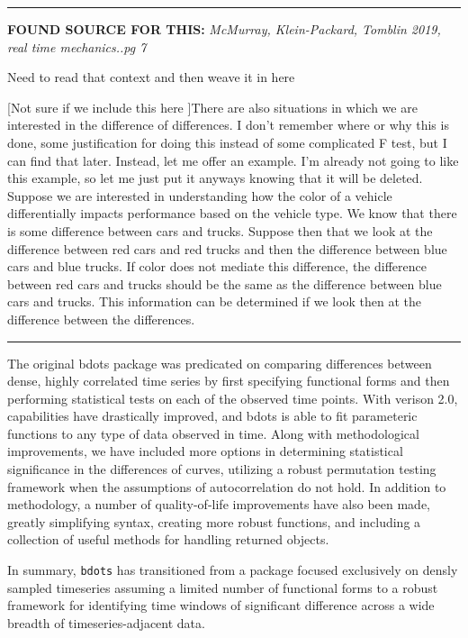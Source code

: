 \documentclass{article}
\begin{document}
\noindent\rule{2cm}{0.4pt}

\textbf{FOUND SOURCE FOR THIS:} \textit{McMurray, Klein-Packard, Tomblin 2019, real time mechanics..pg 7}

Need to read that context and then weave it in here

[Not sure if we include this here ]There are also situations in which we are interested in the difference of differences. I don't remember where or why this is done, some justification for doing this instead of some complicated F test, but I can find that later. Instead, let me offer an example. I'm already not going to like this example, so let me just put it anyways knowing that it will be deleted. Suppose we are interested in understanding how the color of a vehicle differentially impacts performance based on the vehicle type. We know that there is some difference between cars and trucks. Suppose then that we look at the difference between red cars and red trucks and then the difference between blue cars and blue trucks. If color does not mediate this difference, the difference between red cars and trucks should be the same as the difference between blue cars and trucks. This information can be determined if we look then at the difference between the differences. 

\noindent\rule{2cm}{0.4pt}

The original bdots package was predicated on comparing differences between dense, highly correlated time series by first specifying functional forms and then performing statistical tests on each of the observed time points. With verison 2.0, capabilities have drastically improved, and bdots is able to fit parameteric functions to any type of data observed in time. Along with methodological improvements, we have included more options in determining statistical significance in the differences of curves, utilizing a {\color{red} robust} permutation testing framework when the assumptions of autocorrelation do not hold. In addition to methodology, a number of quality-of-life improvements have also been made, greatly simplifying syntax, creating more {\color{red} robust} functions, and including a collection of useful methods for handling returned objects.

In summary, \texttt{bdots} has transitioned from a package focused exclusively on densly sampled timeseries assuming a limited number of functional forms to a {\color{red} robust} framework for identifying time windows of significant difference across a wide breadth of timeseries-adjacent data. 
\end{document}
